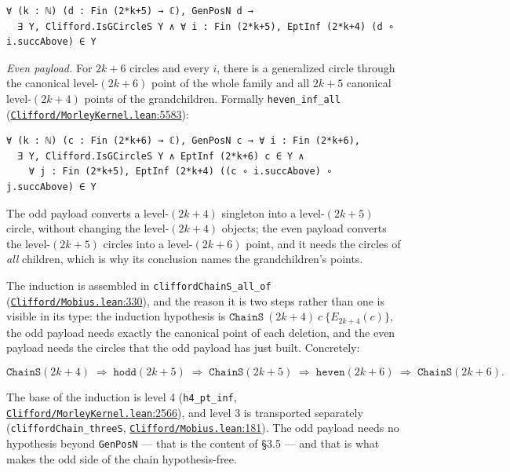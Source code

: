 \documentclass[11pt]{article}
\theoremstyle{definition}
\theoremstyle{remark}
\begin{document}
\begin{Verbatim}
∀ (k : ℕ) (d : Fin (2*k+5) → ℂ), GenPosN d →
  ∃ Y, Clifford.IsGCircleS Y ∧ ∀ i : Fin (2*k+5), EptInf (2*k+4) (d ∘ i.succAbove) ∈ Y
\end{Verbatim}

\emph{Even payload.} For \(2k+6\) circles and every \(i\), there is a generalized circle through the canonical
level-\((2k+6)\) point of the whole family and all \(2k+5\) canonical level-\((2k+4)\) points of the
grandchildren. Formally \texttt{heven\_\allowbreak inf\_\allowbreak all} (\href{https://github.com/jpbald93/paperl_clifford_chain/blob/e1ae145c2565cc98816635387412edc0a740c27c/Clifford/MorleyKernel.lean\#L5583}{\texttt{Clifford/\allowbreak MorleyKernel.lean}:5583}):

\begin{Verbatim}
∀ (k : ℕ) (c : Fin (2*k+6) → ℂ), GenPosN c → ∀ i : Fin (2*k+6),
  ∃ Y, Clifford.IsGCircleS Y ∧ EptInf (2*k+6) c ∈ Y ∧
    ∀ j : Fin (2*k+5), EptInf (2*k+4) ((c ∘ i.succAbove) ∘ j.succAbove) ∈ Y
\end{Verbatim}

The odd payload converts a level-\((2k+4)\) singleton into a level-\((2k+5)\) circle, without changing the
level-\((2k+4)\) objects; the even payload converts the level-\((2k+5)\) circles into a level-\((2k+6)\) point,
and it needs the circles of \emph{all} children, which is why its conclusion names the grandchildren's points.

The induction is assembled in \texttt{cliffordChainS\_\allowbreak all\_\allowbreak of} (\href{https://github.com/jpbald93/paperl_clifford_chain/blob/e1ae145c2565cc98816635387412edc0a740c27c/Clifford/Mobius.lean\#L330}{\texttt{Clifford/\allowbreak Mobius.lean}:330}), and the reason it is
two steps rather than one is visible in its type: the induction hypothesis is
\(\texttt{ChainS}\ (2k+4)\ c\ \{E_{2k+4}(c)\}\), the odd payload needs exactly the canonical point of each deletion, and
the even payload needs the circles that the odd payload has just built. Concretely:

\[ \texttt{ChainS}(2k+4) \;\Rightarrow\; \texttt{hodd}(2k+5) \;\Rightarrow\; \texttt{ChainS}(2k+5) \;\Rightarrow\; \texttt{heven}(2k+6) \;\Rightarrow\; \texttt{ChainS}(2k+6). \]

The base of the induction is level 4 (\texttt{h4\_\allowbreak pt\_\allowbreak inf}, \href{https://github.com/jpbald93/paperl_clifford_chain/blob/e1ae145c2565cc98816635387412edc0a740c27c/Clifford/MorleyKernel.lean\#L2566}{\texttt{Clifford/\allowbreak MorleyKernel.lean}:2566}), and level 3 is
transported separately (\texttt{cliffordChain\_\allowbreak threeS}, \href{https://github.com/jpbald93/paperl_clifford_chain/blob/e1ae145c2565cc98816635387412edc0a740c27c/Clifford/Mobius.lean\#L181}{\texttt{Clifford/\allowbreak Mobius.lean}:181}). The odd payload needs no
hypothesis beyond \texttt{GenPosN} --- that is the content of \S{}3.5 --- and that is what makes the odd side of the
chain hypothesis-free.
\end{document}
